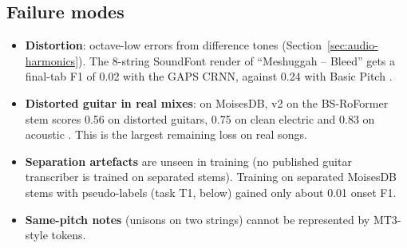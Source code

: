 \subsection{Failure modes}
\begin{itemize}
\item \textbf{Distortion}: octave-low errors from difference tones
  (Section~\ref{sec:audio-harmonics}). The 8-string SoundFont render of
  ``Meshuggah -- Bleed'' gets a final-tab F1 of 0.02 with the GAPS CRNN, against
  0.24 with Basic Pitch \measured.
\item \textbf{Distorted guitar in real mixes}: on MoisesDB, v2 on the
  BS-RoFormer stem scores 0.56 on distorted guitars, 0.75 on clean electric and
  0.83 on acoustic \measured. This is the largest remaining loss on real songs.
\item \textbf{Separation artefacts} are unseen in training (no published guitar
  transcriber is trained on separated stems). Training on separated MoisesDB
  stems with pseudo-labels (task T1, below) gained only about 0.01 onset F1.
\item \textbf{Same-pitch notes} (unisons on two strings) cannot be represented
  by MT3-style tokens.
\end{itemize}
